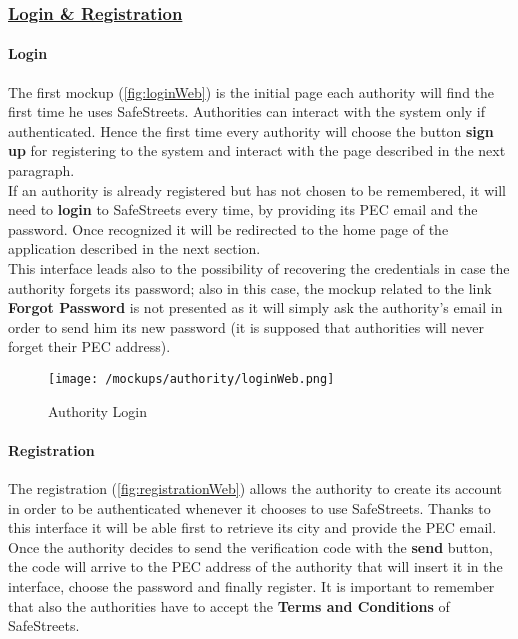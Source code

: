 			\subsubsection[Login \& Registration]{\hyperlink{toc}{Login \& Registration}}
				\label{sec:authorityLoginRegistration}
				
				\paragraph{Login}
				The first mockup (\autoref{fig:loginWeb}) is the initial page each authority will find the first time he uses SafeStreets. Authorities can interact with the system only if authenticated. Hence the first time every authority will choose the button \textbf{sign up} for registering to the system and interact with the page described in the next paragraph.\\
				
				If an authority is already registered but has not chosen to be remembered, it will need to \textbf{login} to SafeStreets every time, by providing its PEC email and the password. Once recognized it will be redirected to the home page of the application described in the next section.\\
				
				This interface leads also to the possibility of recovering the credentials in case the authority forgets its password; also in this case, the mockup related to the link \textbf{Forgot Password} is not presented as it will simply ask the authority's email in order to send him its new password (it is supposed that authorities will never forget their PEC address).
				
				\vspace{0.6cm}
				
				\begin{figure}[ht!]
					\centering
					\texttt{[image: /mockups/authority/loginWeb.png]}
					\caption{\label{fig:loginWeb} Authority Login}
				\end{figure}
			
				\paragraph{Registration}
				The registration (\autoref{fig:registrationWeb}) allows the authority to create its account in order to be authenticated whenever it chooses to use SafeStreets. Thanks to this interface it will be able first to retrieve its city and provide the PEC email. Once the authority decides to send the verification code with the \textbf{send} button, the code will arrive to the PEC address of the authority that will insert it in the interface, choose the password and finally register. It is important to remember that also the authorities have to accept the \textbf{Terms and Conditions} of SafeStreets.\\
				
